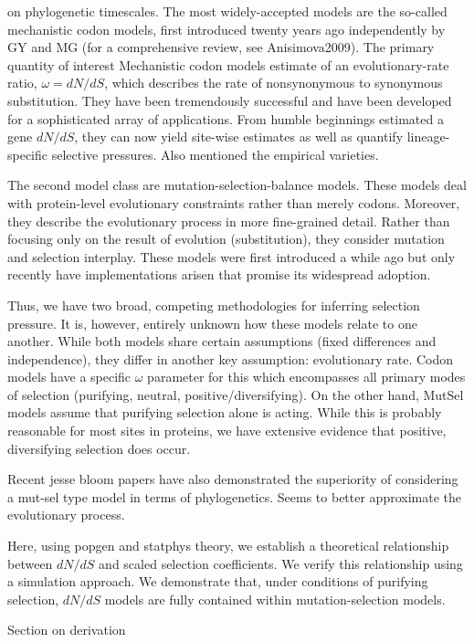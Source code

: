 \documentclass[11pt]{article}
\begin{document}
on phylogenetic timescales. The most widely-accepted models are the so-called mechanistic codon models, first introduced twenty years ago independently by GY and MG (for a comprehensive review, see Anisimova2009). The primary quantity of interest Mechanistic codon models estimate of an evolutionary-rate ratio, $\omega = dN/dS$, which describes the rate of nonsynonymous to synonymous substitution. They have been tremendously successful and have been developed for a sophisticated array of applications. From humble beginnings estimated a gene $dN/dS$, they can now yield site-wise estimates as well as quantify lineage-specific selective pressures. Also mentioned the empirical varieties.
	
The second model class are mutation-selection-balance models. These models deal with protein-level evolutionary constraints rather than merely codons. Moreover, they describe the evolutionary process in more fine-grained detail. Rather than focusing only on the result of evolution (substitution), they consider mutation and selection interplay. These models were first introduced a while ago but only recently have implementations arisen that promise its widespread adoption.

Thus, we have two broad, competing methodologies for inferring selection pressure. It is, however, entirely unknown how these models relate to one another. While both models share certain assumptions (fixed differences and independence), they differ in another key assumption: evolutionary rate. Codon models have a specific $\omega$ parameter for this which encompasses all primary modes of selection (purifying, neutral, positive/diversifying). On the other hand, MutSel models assume that purifying selection alone is acting. While this is probably reasonable for most sites in proteins, we have extensive evidence that positive, diversifying selection does occur. 

Recent jesse bloom papers have also demonstrated the superiority of considering a mut-sel type model in terms of phylogenetics. Seems to better approximate the evolutionary process.

Here, using popgen and statphys theory, we establish a theoretical relationship between $dN/dS$ and scaled selection coefficients. We verify this relationship using a simulation approach. We demonstrate that, under conditions of purifying selection, $dN/dS$ models are fully contained within mutation-selection models. 

Section on derivation
\end{document}
